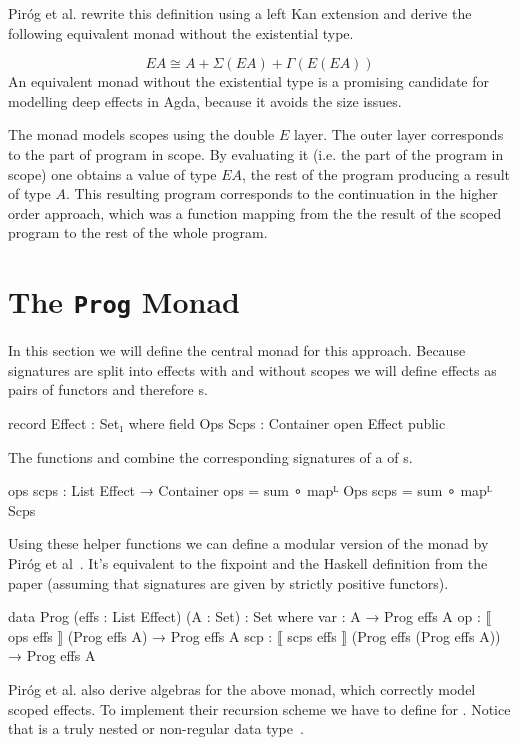 Piróg et al. rewrite this definition using a left Kan extension and derive the
following equivalent monad without the existential type.

\[
  EA \cong A + \Sigma{}(EA) + \Gamma{}(E(EA))
\]
An equivalent monad without the existential type is a promising candidate for
modelling deep effects in Agda, because it avoids the size issues.

The monad models scopes using the double $E$ layer.
The outer layer corresponds to the part of program in scope.
By evaluating it (i.e. the part of the program in scope) one obtains a value of
type $EA$, the rest of the program producing a result of type $A$.
This resulting program corresponds to the continuation in the higher order
approach, which was a function mapping from the the result of the scoped program
to the rest of the whole program.

\section{The \texttt{Prog} Monad}

In this section we will define the central monad for this approach.
Because signatures are split into effects with and without scopes we will define
effects as pairs of functors and therefore s.

\begin{code}
record Effect : Set₁ where
  field
    Ops Scps : Container
open Effect public
\end{code}
The functions  and  combine the
corresponding signatures of a  of s.

\begin{code}
ops scps : List Effect → Container
ops   = sum ∘ mapᴸ Ops
scps  = sum ∘ mapᴸ Scps
\end{code}
Using these helper functions we can define a modular version of the monad by
Piróg et al~\cite{DBLP:conf/lics/PirogSWJ18}.
It's equivalent to the fixpoint and the Haskell definition from the paper
(assuming that signatures are given by strictly positive functors).

\begin{code}
data Prog (effs : List Effect) (A : Set) : Set where
  var  :  A                                         → Prog effs A
  op   :  ⟦ ops  effs  ⟧ (Prog effs A)              → Prog effs A
  scp  :  ⟦ scps effs  ⟧ (Prog effs (Prog effs A))  → Prog effs A
\end{code}
Piróg et al. also derive algebras for the above monad, which correctly model
scoped effects.
To implement their recursion scheme we have to define \AgdaFunction{>>=} for 
\AgdaSpace{}\AgdaSpace{}.
Notice that  is a truly nested or non-regular data
type~\cite{DBLP:conf/mpc/BirdM98}.


